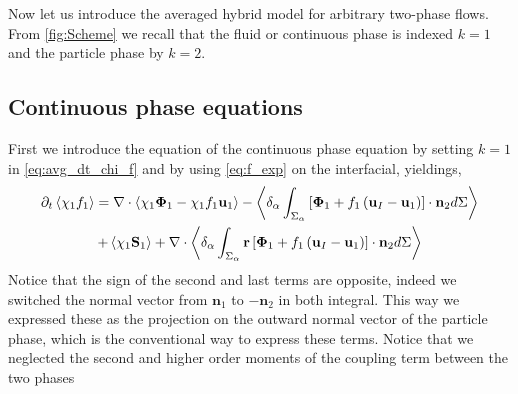 
Now let us introduce the averaged hybrid model for arbitrary two-phase flows. 
From \ref{fig:Scheme} we recall that the fluid or continuous phase is indexed $k=1$ and the particle phase by $k=2$.  

\subsection{Continuous phase equations}
First we introduce the equation of the continuous phase equation by setting $k = 1$ in \ref{eq:avg_dt_chi_f} and by using \ref{eq:f_exp} on the interfacial, yieldings,
\begin{multline}
    \partial_t \left<\chi_1 f_1\right>
    = \mathbf{\nabla} \cdot \left<\chi_1 \mathbf{\Phi}_1 - \chi_1 f_1 \textbf{u}_1\right>
    - \left<\delta_\alpha \int_{\Sigma_\alpha}\left[
        \mathbf{\Phi}_1  
        + f_1
        \left(
            \textbf{u}_I
            - \textbf{u}_1
        \right)
    \right]
    \cdot \textbf{n}_2d\Sigma\right> \\
    + \left<\chi_1 \textbf{S}_1\right>
    +  \mathbf{\nabla} \cdot \left<\delta_\alpha \int_{\Sigma_\alpha} \textbf{r}\left[
        \mathbf{\Phi}_1
        + f_1
        \left(
            \textbf{u}_I
            - \textbf{u}_1
        \right)
    \right]
    \cdot \textbf{n}_2d\Sigma\right> 
    \label{eq:hybrid_avg_dt_chif}
\end{multline}
Notice that the sign of the second and last terms are opposite, indeed we switched the normal vector from $\textbf{n}_1$ to $-\textbf{n}_2$ in both integral. 
This way we expressed these as the projection on the outward normal vector of the particle phase, which is the conventional way to express these terms.  
Notice that we neglected the second and higher order moments of the coupling term between the two phases \citep{jackson1997locally}


